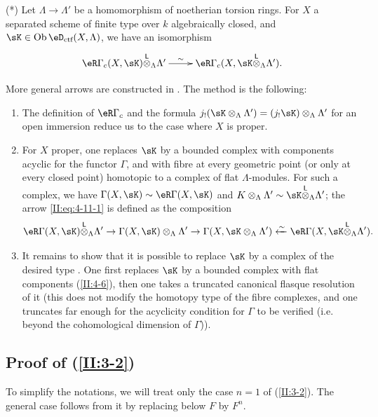 (*) Let $\Lambda\to\Lambda'$ be a homomorphism of noetherian torsion rings.
For $X$ a separated scheme of finite type over $k$ algebraically
closed, and $\sK\in\ob\eD_\text{ctf}(X,\Lambda)$, we have an isomorphism
\[\xymatrix{
  \eR\Gamma_c(X,\sK)\lotimes_\Lambda \Lambda' \ar[r]^-\sim & \eR \Gamma_c(X,\sK\lotimes_\Lambda \Lambda') \text{.}
}\]

More general arrows are constructed in \cite[XVII 4.2.12]{sga4}. The
method is the following:
\begin{enumerate}[\indent a)]
  \item The definition of $\eR\Gamma_c$ and the formula
    $j_!(\sK\otimes_\Lambda\Lambda') = (j_! \sK)\otimes_\Lambda\Lambda'$ for an
    open immersion reduce us to the case where $X$ is proper.
  \item For $X$ proper, one replaces $\sK$ by a bounded complex with
    components acyclic for the functor $\Gamma$, and with fibre at every
    geometric point (or only at every closed point) homotopic to a
    complex of flat $\Lambda$-modules. For such a complex, we have
    $\Gamma(X,\sK)\sim \eR\Gamma(X,\sK)$ and
    $K\otimes_\Lambda\Lambda'\sim \sK\lotimes_\Lambda\Lambda'$; the arrow
    \eqref{II:eq:4-11-1} is defined as the composition
    \[
      \eR\Gamma(X,\sK)\lotimes_\Lambda \Lambda' \to \Gamma(X,\sK)\otimes_\Lambda\Lambda' \to \Gamma(X,\sK\otimes_\Lambda\Lambda') \xleftarrow\sim \eR\Gamma(X,\sK\lotimes_\Lambda\Lambda') \text{.}
    \]
  \item It remains to show that it is possible to replace $\sK$ by a
    complex of the desired type \cite[XVII.4.2.10]{sga4}. One first replaces $\sK$ by
    a bounded complex with flat components (\ref{II:4-6}), then one takes
    a truncated canonical flasque resolution of it (this does not modify the homotopy
    type of the fibre complexes, and one truncates far enough for
    the acyclicity condition for $\Gamma$ to be verified (i.e. beyond
    the cohomological dimension of $\Gamma$)).
\end{enumerate}




\subsection{Proof of \texorpdfstring{(\ref{II:3-2})}{(3.2)}}\label{II:4-13}

To simplify the notations, we will treat only the case $n=1$ of
(\ref{II:3-2}). The general case follows from it by replacing below
$F$ by $F^n$.

